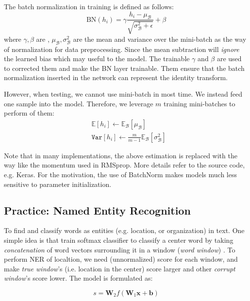 The batch normalization in training is defined as follows:
\begin{equation}
\text{BN}(h_i) = \gamma \frac{h_i - \mu_{\mathcal{B}}}{\sqrt{\sigma_{\mathcal{B}}^2 + \epsilon}} + \beta
\end{equation}
where $\gamma, \beta$ are , $\mu_{\mathcal{B}}, \sigma_{\mathcal{B}}^2$ are the mean and variance over the mini-batch as the way of normalization for data preprocessing.
Since the mean subtraction will \emph{ignore} the learned bias which may useful to the model.
The trainable $\gamma$ and $\beta$ are used to corrected them and make the BN layer trainable.
Them ensure that the batch normalization inserted in the network can represent the identity transform.

However, when testing, we cannot use mini-batch in most time.
We instead feed one sample into the model.
Therefore, we leverage $m$ training mini-batches to perform  of them:
\begin{align}
&\mathbb{E}[h_i] \leftarrow \mathbb{E}_{\mathcal{B}}[\mu_{\mathcal{B}}] \nonumber \\
&\texttt{Var}[h_i] \leftarrow \frac{m}{m-1} \mathbb{E}_{\mathcal{B}}[\sigma_{\mathcal{B}}^2] \nonumber
\end{align}

Note that in many implementations, the above estimation is replaced with the way like the momentum used in RMSprop.
More details refer to the source code, e.g. Keras.
For the motivation, the use of BatchNorm makes models much less sensitive to parameter initialization.

\subsection{Practice: Named Entity Recognition}
To find and classify words as entities (e.g. location, or organization) in text.
One simple idea is that train softmax classifier to classify a center word by taking
\emph{concatenation} of word vectors surrounding it in a window (\emph{word window}) .
To perform NER of localtion, we need (unnormalized) score for each window, and make \emph{true window}’s (i.e. location in the center) score larger and other \emph{corrupt window}’s score lower.
The model is formulated as:

\begin{equation}
s = \bm{W}_2 f(\bm{W}_1 \bm{x} + \bm{b})
\end{equation}


